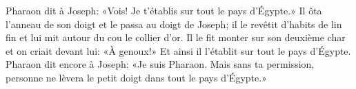 Pharaon dit à Joseph: «Vois! Je t’établis sur tout le pays d’Égypte.»
Il ôta l’anneau de son doigt et le passa au doigt de Joseph;
	il le revêtit d’habits de lin fin et lui mit autour du cou le collier d’or.
Il le fit monter sur son deuxième char et on criait devant lui: «À genoux!»
	Et ainsi il l’établit sur tout le pays d’Égypte.
Pharaon dit encore à Joseph: «Je suis Pharaon.
	Mais sans ta permission,
	personne ne lèvera le petit doigt dans tout le pays d’Égypte.»
